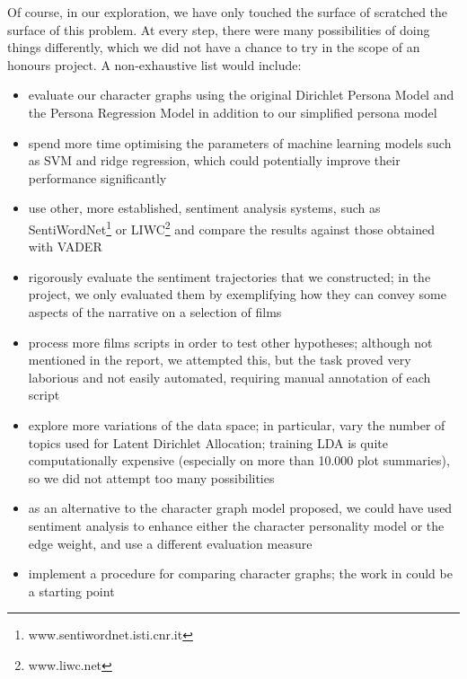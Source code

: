 \documentclass[bsc,frontabs,singlespacing,parskip, twoside]{infthesis}
\begin{document}
Of course, in our exploration, we have only touched the surface of scratched the surface of this problem. At every step, there were many possibilities of doing things differently, which we did not have a chance to try in the scope of an honours project. A non-exhaustive list would include:
\begin{itemize}
	\item evaluate our character graphs using the original Dirichlet Persona Model and the Persona Regression Model in addition to our simplified persona model
	\item spend more time optimising the parameters of machine learning models such as SVM and ridge regression, which could potentially improve their performance significantly
	\item use other, more established, sentiment analysis systems, such as SentiWordNet\footnote{www.sentiwordnet.isti.cnr.it} or LIWC\footnote{www.liwc.net} and compare the results against those obtained with \textsc{VADER}
	\item rigorously evaluate the sentiment trajectories that we constructed; in the project, we only evaluated them by exemplifying how they can convey some aspects of the narrative on a selection of films
	\item process more films scripts in order to test other hypotheses; although not mentioned in the report, we attempted this, but the task proved very laborious and not easily automated, requiring manual annotation of each script
	\item explore more variations of the data space; in particular, vary the number of topics used for Latent Dirichlet Allocation; training LDA is quite computationally expensive (especially on more than 10.000 plot summaries), so we did not attempt too many possibilities
	\item as an alternative to the character graph model proposed, we could have used sentiment analysis to enhance either the character personality model or the edge weight, and use a different evaluation measure
	\item implement a procedure for comparing character graphs; the work in \cite{elsner2012character} could be a starting point
\end{itemize}
\end{document}

